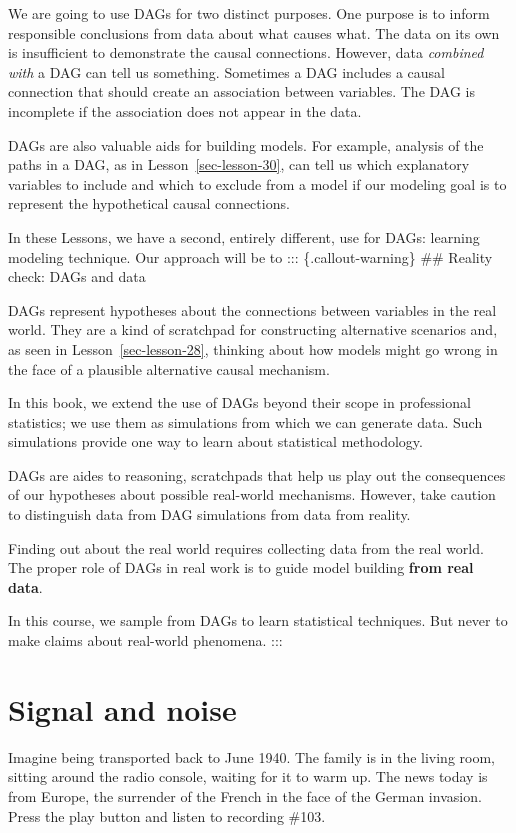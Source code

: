 \documentclass[
  letterpaper,
  DIV=11,
  numbers=noendperiod,
  oneside]{scrreprt}
\begin{document}
We are going to use DAGs for two distinct purposes. One purpose is to
inform responsible conclusions from data about what causes what. The
data on its own is insufficient to demonstrate the causal connections.
However, data \emph{combined with} a DAG can tell us something.
Sometimes a DAG includes a causal connection that should create an
association between variables. The DAG is incomplete if the association
does not appear in the data.

DAGs are also valuable aids for building models. For example, analysis
of the paths in a DAG, as in Lesson~\ref{sec-lesson-30}, can tell us
which explanatory variables to include and which to exclude from a model
if our modeling goal is to represent the hypothetical causal
connections.

In these Lessons, we have a second, entirely different, use for DAGs:
learning modeling technique. Our approach will be to :::
\{.callout-warning\} \#\# Reality check: DAGs and data

DAGs represent hypotheses about the connections between variables in the
real world. They are a kind of scratchpad for constructing alternative
scenarios and, as seen in Lesson~\ref{sec-lesson-28}, thinking about how
models might go wrong in the face of a plausible alternative causal
mechanism.

In this book, we extend the use of DAGs beyond their scope in
professional statistics; we use them as simulations from which we can
generate data. Such simulations provide one way to learn about
statistical methodology.

DAGs are aides to reasoning, scratchpads that help us play out the
consequences of our hypotheses about possible real-world mechanisms.
However, take caution to distinguish data from DAG simulations from data
from reality.

Finding out about the real world requires collecting data from the real
world. The proper role of DAGs in real work is to guide model building
\textbf{from real data}.

In this course, we sample from DAGs to learn statistical techniques. But
never to make claims about real-world phenomena. :::

\hypertarget{sec-lesson-21}{%
\chapter{Signal and noise}\label{sec-lesson-21}}

Imagine being transported back to June 1940. The family is in the living
room, sitting around the radio console, waiting for it to warm up. The
news today is from Europe, the surrender of the French in the face of
the German invasion. Press the play button and listen to recording
\#103.
\end{document}
